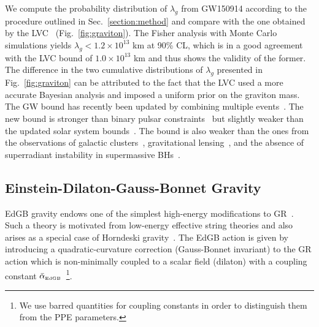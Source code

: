 \documentclass[prd,twocolumn,nofootinbib]{revtex4-1}
\newcommand{\EDGB}{{\mbox{\tiny EdGB}}}
\begin{document}
We compute the probability distribution of $\lambda_g$ from GW150914 according to the procedure outlined in Sec.~\ref{section:method} and compare with the one obtained by the LVC~\cite{TheLIGOScientific:2016src} (Fig.~\ref{fig:graviton}). The Fisher analysis with Monte Carlo simulations yields $\lambda_g<1.2\times 10^{13}$ km at 90\% CL, which is in a good agreement with the LVC bound of $1.0\times10^{13}$ km and thus shows the validity of the former. The difference in the two cumulative distributions of $\lambda_g$ presented in Fig.~\ref{fig:graviton} can be attributed to the fact that the LVC used a more accurate Bayesian analysis and imposed a uniform prior on the graviton mass.
The GW bound has recently been updated by combining multiple events~\cite{LIGOScientific:2019fpa}. The new bound is stronger than binary pulsar constraints~\cite{Finn:2001qi,Miao:2019nhf} but slightly weaker than the updated solar system bounds~\cite{Will:2018gku}. The bound is also weaker than the ones from the observations of galactic clusters~\cite{Goldhaber:1974wg}, gravitational lensing~\cite{Choudhury:2002pu}, and the absence of superradiant instability in supermassive BHs~\cite{Brito:2013wya}.


\subsection{Einstein-Dilaton-Gauss-Bonnet Gravity}\label{EdGB}
EdGB gravity endows one of the simplest high-energy modifications to GR~\cite{Moura:2006pz,Pani:2009wy}. Such a theory is motivated from low-energy effective string theories and also arises as a special case of Horndeski gravity~\cite{Zhang:2017unx,Berti:2015itd}. 
The EdGB action is given by introducing a quadratic-curvature correction (Gauss-Bonnet invariant) to the GR action which is non-minimally coupled to a scalar field (dilaton) with a coupling constant $\bar{\alpha}_\EDGB$~\cite{Kanti:1995vq}\footnote{We use barred quantities for coupling constants in order to distinguish them from the PPE parameters.}.
\end{document}
